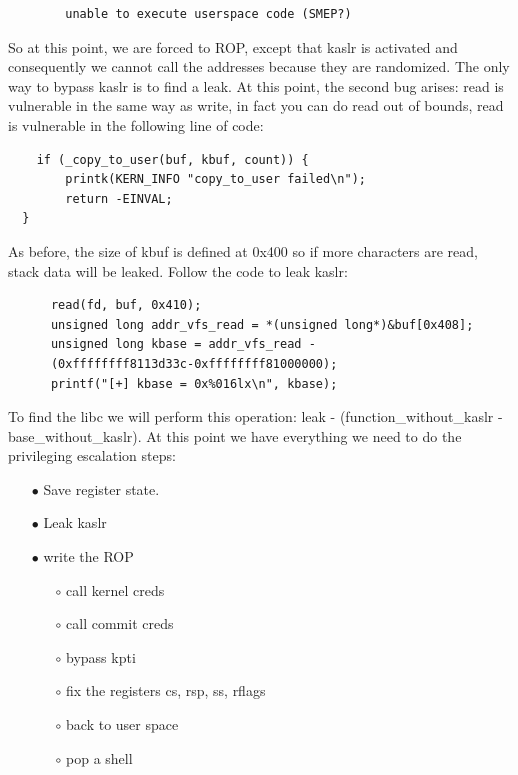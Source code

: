     \begin{verbatim}
        unable to execute userspace code (SMEP?)
    \end{verbatim}
    So at this point, we are forced to ROP, except that kaslr is activated and consequently we cannot call the addresses because they are randomized.\newline
    The only way to bypass kaslr is to find a leak.\newline
    At this point, the second bug arises: read is vulnerable in the same way as write, in fact you can do read out of bounds, read is vulnerable in the following line of code:\newline
    \begin{verbatim}
    if (_copy_to_user(buf, kbuf, count)) {
        printk(KERN_INFO "copy_to_user failed\n");
        return -EINVAL;
  }
    \end{verbatim}
   As before, the size of kbuf is defined at 0x400 so if more characters are read, stack data will be leaked.\newline 
   Follow the code to leak kaslr:\newline
   \begin{verbatim}
      read(fd, buf, 0x410);
      unsigned long addr_vfs_read = *(unsigned long*)&buf[0x408];
      unsigned long kbase = addr_vfs_read - 
      (0xffffffff8113d33c-0xffffffff81000000);
      printf("[+] kbase = 0x%016lx\n", kbase);
   \end{verbatim}
   To find the libc we will perform this operation: leak - (function\_without\_kaslr - base\_without\_kaslr).\newline
   At this point we have everything we need to do the privileging escalation steps:\newline
    \begin{itemize}
        \item[$\bullet$] Save register state.
        \item[$\bullet$] Leak kaslr  
        \item[$\bullet$] write the ROP   
        \begin{itemize}
            \item[$\circ$] call kernel creds
            \item[$\circ$] call commit creds
            \item[$\circ$] bypass kpti
            \item[$\circ$] fix the registers cs, rsp, ss, rflags
            \item[$\circ$] back to user space 
            \item[$\circ$] pop a shell 
        \end{itemize}
    \end{itemize}
